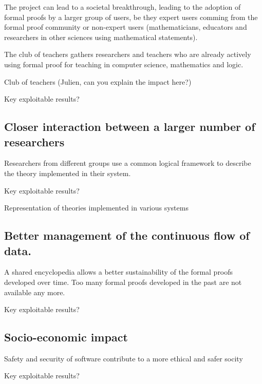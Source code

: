 The project can lead to a societal breakthrough, leading to the adoption of
formal proofs by a larger group of users, be they expert users comming from the
formal proof community or non-expert users (mathematicians, educators and
researchers in other sciences using mathematical statements).

The club of teachers gathers researchers and teachers who are already actively
using formal proof for teaching in computer science, mathematics and logic.


{\color{red} Club of teachers (Julien, can you explain the impact here?)}

{\color{red} Key exploitable results?}

\subsection{Closer interaction between a larger number of researchers}

Researchers from different groups use a common logical framework to
describe the theory implemented in their system.

{\color{red} Key exploitable results?}

Representation of theories implemented in various systems


\subsection{Better management of the continuous flow of data.}

A shared encyclopedia allows a better sustainability of the formal
proofs developed over time. Too many formal proofs developed in the
past are not available any more.

{\color{red} Key exploitable results?}

\subsection{Socio-economic impact}

{\color{red} Safety and security of software contribute to a more ethical
  and safer socity}

{\color{red} Key exploitable results?}
